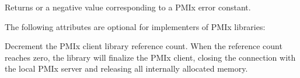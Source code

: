 \begin{arglist}
\end{arglist}

Returns  or a negative value corresponding to a PMIx error constant.

\optattrstart
The following attributes are optional for implementers of \ac{PMIx} libraries:

\optattrend

\descr

Decrement the \ac{PMIx} client library reference count.
When the reference count reaches zero, the library will finalize the \ac{PMIx} client, closing the connection with the local \ac{PMIx} server and releasing all internally allocated memory.


